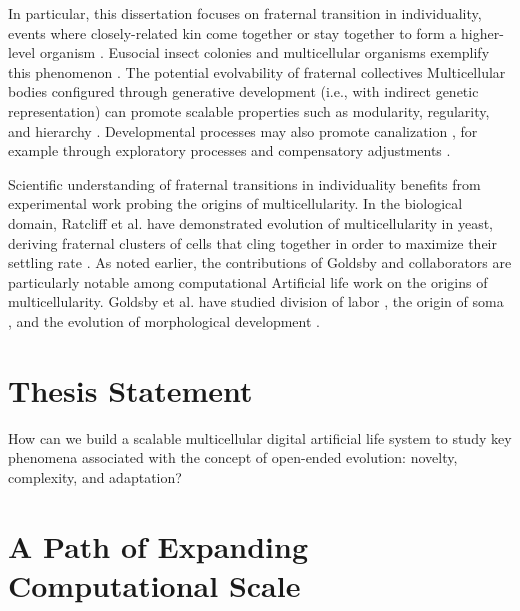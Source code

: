 In particular, this dissertation focuses on fraternal transition in individuality, events where closely-related kin come together or stay together to form a higher-level organism \citep{queller1997cooperators}.
Eusocial insect colonies and multicellular organisms exemplify this phenomenon \citep{smith1997major}.
The potential evolvability of fraternal collectives
Multicellular bodies configured through generative development (i.e., with indirect genetic representation) can promote scalable properties \citep{lipson2007principles} such as modularity, regularity, and hierarchy \citep{hornby2005measuring, clune2011performance}.
Developmental processes may also promote canalization \citep{stanley2003taxonomy}, for example through exploratory processes and compensatory adjustments \citep{gerhart2007theory}.

Scientific understanding of fraternal transitions in individuality benefits from experimental work probing the origins of multicellularity.
In the biological domain, Ratcliff et al. have demonstrated evolution of multicellularity in yeast, deriving fraternal clusters of cells that cling together in order to maximize their settling rate \citep{ratcliff2012experimental}.
As noted earlier, the contributions of Goldsby and collaborators are particularly notable among computational Artificial life work on the origins of multicellularity.
Goldsby et al. have studied division of labor \citep{goldsby2010evolution, goldsby2012task}, the origin of soma \citep{goldsby2014evolutionary}, and the evolution of morphological development \citep{goldsby2017increasing}.

\section{Thesis Statement}

How can we build a scalable multicellular digital artificial life system to study key phenomena associated with the concept of open-ended evolution: novelty, complexity, and adaptation?

\section{A Path of Expanding Computational Scale}

